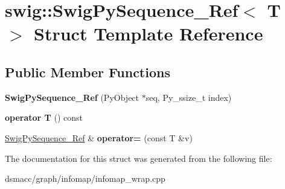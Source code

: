 \hypertarget{structswig_1_1SwigPySequence__Ref}{}\section{swig\+:\+:Swig\+Py\+Sequence\+\_\+\+Ref$<$ T $>$ Struct Template Reference}
\label{structswig_1_1SwigPySequence__Ref}
\subsection*{Public Member Functions}
\begin{DoxyCompactItemize}
\item 
\mbox{\label{structswig_1_1SwigPySequence__Ref_a54c91c58a08cd1545f4443db3b67598c}} 
{\bfseries Swig\+Py\+Sequence\+\_\+\+Ref} (Py\+Object $\ast$seq, Py\+\_\+ssize\+\_\+t index)
\item 
\mbox{\label{structswig_1_1SwigPySequence__Ref_a148e950c46eb0a1531513453dfc35482}} 
{\bfseries operator T} () const
\item 
\mbox{\label{structswig_1_1SwigPySequence__Ref_a71732475dadcaebf7e61bd5377199ee2}} 
\mbox{\hyperlink{structswig_1_1SwigPySequence__Ref}{Swig\+Py\+Sequence\+\_\+\+Ref}} \& {\bfseries operator=} (const T \&v)
\end{DoxyCompactItemize}


The documentation for this struct was generated from the following file\+:\begin{DoxyCompactItemize}
\item 
dsmacc/graph/infomap/infomap\+\_\+wrap.\+cpp\end{DoxyCompactItemize}
